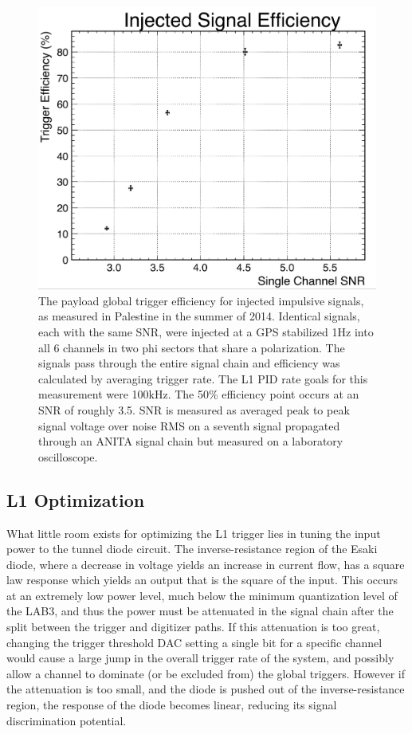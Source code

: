 	\begin{figure}
	\centering
	\includegraphics[width=\textwidth]{figures/palestineTrigEfficiency}
	\caption{The payload global trigger efficiency for injected impulsive signals, as measured in Palestine in the summer of 2014. Identical signals, each with the same SNR, were injected at a GPS stabilized 1Hz into all 6 channels in two phi sectors that share a polarization.  The signals pass through the entire signal chain and efficiency was calculated by averaging trigger rate.  The L1 PID rate goals for this measurement were 100kHz.  The 50\% efficiency point occurs at an SNR of roughly 3.5.  SNR is measured as averaged peak to peak signal voltage over noise RMS on a seventh signal propagated through an ANITA signal chain but measured on a laboratory oscilloscope.}
	\label{fig:efficiency}
	\end{figure}
		
		
	\subsection{L1 Optimization}
		What little room exists for optimizing the L1 trigger  lies in tuning the input power to the tunnel diode circuit.  The inverse-resistance region of the Esaki diode, where a decrease in voltage yields an increase in current flow, has a square law response which yields an output that is the square of the input.  This occurs at an extremely low power level, much below the minimum quantization level of the LAB3, and thus the power must be attenuated in the signal chain after the split between the trigger and digitizer paths.  If this attenuation is too great, changing the trigger threshold DAC setting a single bit for a specific channel would cause a large jump in the overall trigger rate of the system, and possibly allow a channel to dominate (or be excluded from) the global triggers.  However if the attenuation is too small, and the diode is pushed out of the inverse-resistance region, the response of the diode becomes linear, reducing its signal discrimination potential.
		
